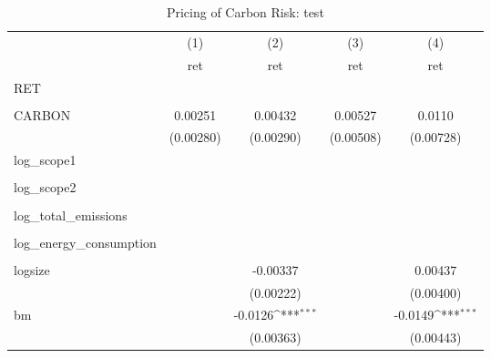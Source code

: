 \begin{table}[htbp]\centering
\def\sym#1{\ifmmode^{#1}\else\(^{#1}\)\fi}
\caption{Pricing of Carbon Risk: test}
\begin{tabular}{l*{4}{c}}
\hline\hline
                &\multicolumn{1}{c}{(1)}&\multicolumn{1}{c}{(2)}&\multicolumn{1}{c}{(3)}&\multicolumn{1}{c}{(4)}\\
                &\multicolumn{1}{c}{ret}&\multicolumn{1}{c}{ret}&\multicolumn{1}{c}{ret}&\multicolumn{1}{c}{ret}\\
\hline
RET             &                  &                  &                  &                  \\
                &                  &                  &                  &                  \\
CARBON          &  0.00251         &  0.00432         &  0.00527         &   0.0110         \\
                &(0.00280)         &(0.00290)         &(0.00508)         &(0.00728)         \\
log\_scope1      &                  &                  &                  &                  \\
                &                  &                  &                  &                  \\
log\_scope2      &                  &                  &                  &                  \\
                &                  &                  &                  &                  \\
log\_total\_emissions&                  &                  &                  &                  \\
                &                  &                  &                  &                  \\
log\_energy\_consumption&                  &                  &                  &                  \\
                &                  &                  &                  &                  \\
logsize         &                  & -0.00337         &                  &  0.00437         \\
                &                  &(0.00222)         &                  &(0.00400)         \\
bm              &                  &  -0.0126\sym{***}&                  &  -0.0149\sym{***}\\
                &                  &(0.00363)         &                  &(0.00443)         \\

\end{tabular}
\end{table}
